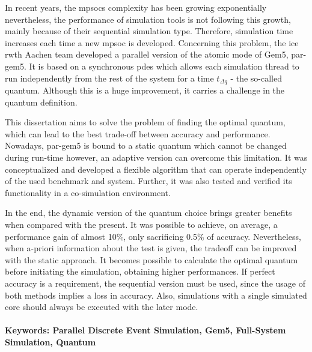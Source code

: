 





In recent years, the \glspl{mpsoc} complexity has been growing exponentially nevertheless, the performance of simulation tools is not 
following this growth, mainly because of their sequential simulation type. Therefore, simulation time increases each time a new \gls{mpsoc} 
is developed. Concerning this problem, the \gls{ice} \gls{rwth} Aachen team developed a parallel version of the atomic mode of Gem5, par-gem5. 
It is based on a synchronous \gls{pdes} which allows each simulation thread to run independently from the rest of the system for a time 
$t_{\Delta q}$ - the so-called quantum. Although this is a huge improvement, it carries a challenge in the quantum definition. 

This dissertation aims to solve the problem of finding the optimal quantum, which can lead to the best trade-off between accuracy and 
performance. Nowadays, par-gem5 is bound to a static quantum which cannot be changed during run-time however, an adaptive version can overcome 
this limitation. It was conceptualized and developed a flexible algorithm that can operate independently of the used benchmark and system.
Further, it was also tested and verified its functionality in a co-simulation environment.

In the end, the dynamic version of the quantum choice brings greater benefits when compared with the present. It was possible to achieve, 
on average, a performance gain of almost 10\%, only sacrificing 0.5\% of accuracy. Nevertheless, when a-priori information about the 
test is given, the tradeoff can be improved with the static approach. It becomes possible to calculate the optimal quantum before 
initiating the simulation, obtaining higher performances. If perfect accuracy is a requirement, the sequential version must be used, 
since the usage of both methods implies a loss in accuracy. Also, simulations with a single simulated core should always be 
executed with the later mode.


\paragraph{}\textbf{Keywords: Parallel Discrete Event Simulation, Gem5, Full-System Simulation, Quantum}
